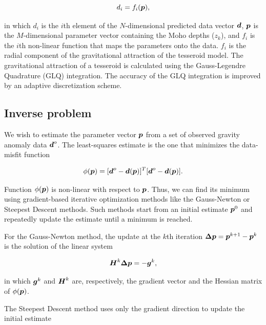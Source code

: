 \documentclass[extra]{gji}
\newcommand{\mbf}[1]{\hbox{\mathversion{bold}$#1$}}
\begin{document}
\begin{equation}
    d_i = f_i(\mbf{p}),
\end{equation}

\noindent in which $d_i$ is the $i$th element of the $N$-dimensional predicted
data vector $\mbf{d}$, $\mbf{p}$ is the $M$-dimensional parameter vector
containing the Moho depths ($z_k$),
and $f_i$ is the $i$th non-linear function that maps the parameters onto the
data.
$f_i$ is the radial component of the gravitational attraction of the tesseroid
model.
The gravitational attraction of a tesseroid is calculated using the
Gauss-Legendre Quadrature (GLQ) integration.
The accuracy of the GLQ integration is improved by an adaptive discretization
scheme.


\subsection{Inverse problem}

We wish to estimate the parameter vector $\mbf{p}$ from a set of observed
gravity anomaly data $\mbf{d}^o$.
The least-squares estimate is the one that minimizes the data-misfit function

\begin{equation}
    \phi(\mbf{p}) =
    [\mbf{d}^o - \mbf{d}(\mbf{p})]^T[\mbf{d}^o - \mbf{d}(\mbf{p})].
    \label{eq:data-misfit}
\end{equation}

Function $\phi(\mbf{p})$ is non-linear with respect to $\mbf{p}$.
Thus, we can find its minimum using gradient-based
iterative optimization
methods like the Gauss-Newton or Steepest Descent methods.
Such methods start from an initial estimate $\mbf{p}^0$ and repeatedly update
the estimate until a minimum is reached.

For the Gauss-Newton method,
the update at the $k$th iteration $\mbf{\Delta p} = \mbf{p}^{k+1} - \mbf{p}^k$
is the solution of the linear system

\begin{equation}
    \mbf{H}^k\mbf{\Delta p} = -\mbf{g}^k,
    \label{eq:gaussnewton}
\end{equation}

\noindent in which
$\mbf{g}^k$ and $\mbf{H}^k$ are, respectively,
the gradient vector and the Hessian matrix of $\phi(\mbf{p})$.

The Steepest Descent method uses only the gradient direction
to update the initial estimate
\end{document}

